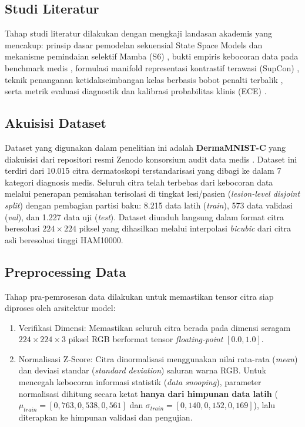 \subsection{Studi Literatur} \label{III.Studi}
Tahap studi literatur dilakukan dengan mengkaji landasan akademis yang mencakup: prinsip dasar pemodelan sekuensial State Space Models dan mekanisme pemindaian selektif Mamba (S6) \cite{gu2024mamba, yue2024medmamba}, bukti empiris kebocoran data pada benchmark medis \cite{abhishek2025investigating}, formulasi manifold representasi kontrastif terawasi (SupCon) \cite{khosla2020supervised}, teknik penanganan ketidakseimbangan kelas berbasis bobot penalti terbalik \cite{cui2019classbalanced, salmi2024imbalanced}, serta metrik evaluasi diagnostik dan kalibrasi probabilitas klinis (ECE) \cite{gorodkin2004mcc, guo2017calibration}. \par

\subsection{Akuisisi Dataset} \label{III.Akuisisi}
Dataset yang digunakan dalam penelitian ini adalah \textbf{DermaMNIST-C} yang diakuisisi dari repositori resmi Zenodo konsorsium audit data medis \cite{abhishek2025investigating}. Dataset ini terdiri dari 10.015 citra dermatoskopi terstandarisasi yang dibagi ke dalam 7 kategori diagnosis medis. Seluruh citra telah terbebas dari kebocoran data melalui penerapan pemisahan terisolasi di tingkat lesi/pasien (\textit{lesion-level disjoint split}) dengan pembagian partisi baku: 8.215 data latih (\textit{train}), 573 data validasi (\textit{val}), dan 1.227 data uji (\textit{test}). Dataset diunduh langsung dalam format citra beresolusi $224 \times 224$ piksel yang dihasilkan melalui interpolasi \textit{bicubic} dari citra asli beresolusi tinggi HAM10000. \par

\subsection{Preprocessing Data} \label{III.Preprocessing}
Tahap pra-pemrosesan data dilakukan untuk memastikan tensor citra siap diproses oleh arsitektur model:
\begin{enumerate}[noitemsep]
	\item Verifikasi Dimensi: Memastikan seluruh citra berada pada dimensi seragam $224 \times 224 \times 3$ piksel RGB berformat tensor \textit{floating-point} $[0.0, 1.0]$.
	\item Normalisasi Z-Score: Citra dinormalisasi menggunakan nilai rata-rata (\textit{mean}) dan deviasi standar (\textit{standard deviation}) saluran warna RGB. Untuk mencegah kebocoran informasi statistik (\textit{data snooping}), parameter normalisasi dihitung secara ketat \textbf{hanya dari himpunan data latih} ($\mu_{train} = [0,763, 0,538, 0,561]$ dan $\sigma_{train} = [0,140, 0,152, 0,169]$), lalu diterapkan ke himpunan validasi dan pengujian.
\end{enumerate}

